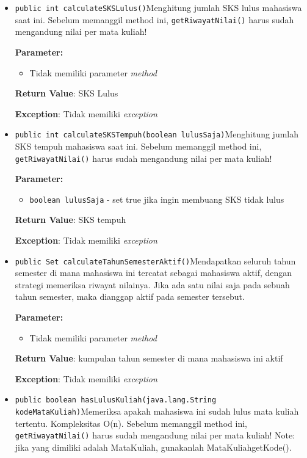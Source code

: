 \documentclass{article}
\begin{document}
\begin{enumerate}
\begin{itemize}
\item \texttt{public int calculateSKSLulus()}Menghitung jumlah SKS lulus mahasiswa saat ini.
 Sebelum memanggil method ini, \texttt{getRiwayatNilai()} harus sudah mengandung nilai per mata kuliah!

\textbf{Parameter:}
\begin{itemize}
\item Tidak memiliki parameter \textit{method}
\end{itemize}
\textbf{Return Value}: SKS Lulus

\textbf{Exception}: Tidak memiliki \textit{exception}

\item \texttt{public int calculateSKSTempuh(boolean lulusSaja)}Menghitung jumlah SKS tempuh mahasiswa saat ini.
 Sebelum memanggil method ini, \texttt{getRiwayatNilai()} harus sudah mengandung nilai per mata kuliah!

\textbf{Parameter:}
\begin{itemize}
\item \texttt{boolean lulusSaja} - 
set true jika ingin membuang SKS tidak lulus
\end{itemize}
\textbf{Return Value}: SKS tempuh

\textbf{Exception}: Tidak memiliki \textit{exception}

\item \texttt{public Set calculateTahunSemesterAktif()}Mendapatkan seluruh tahun semester di mana mahasiswa ini tercatat
 sebagai mahasiswa aktif, dengan strategi memeriksa riwayat nilainya.
 Jika ada satu nilai saja pada sebuah tahun semester, maka dianggap
 aktif pada semester tersebut.

\textbf{Parameter:}
\begin{itemize}
\item Tidak memiliki parameter \textit{method}
\end{itemize}
\textbf{Return Value}: kumpulan tahun semester di mana mahasiswa ini aktif

\textbf{Exception}: Tidak memiliki \textit{exception}

\item \texttt{public boolean hasLulusKuliah(java.lang.String kodeMataKuliah)}Memeriksa apakah mahasiswa ini sudah lulus mata kuliah tertentu. Kompleksitas O(n).
 Sebelum memanggil method ini, \texttt{getRiwayatNilai()} harus sudah mengandung nilai per mata kuliah!
 Note: jika yang dimiliki adalah MataKuliah, gunakanlah MataKuliahgetKode().


\end{itemize}
\end{enumerate}
\end{document}
